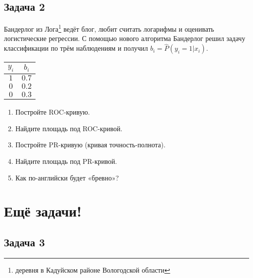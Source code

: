 \documentclass[12pt, a4paper, oneside]{article}
\begin{document}



\subsection*{Задача 2}

	Бандерлог из Лога\footnote{деревня в Кадуйском районе Вологодской области} ведёт блог, любит считать логарифмы и оценивать логистические регрессии. С помощью нового алгоритма Бандерлог решил задачу классификации по трём наблюдениям и получил $b_i = \hat P(y_i = 1|x_i)$.
	
\begin{center}
	\begin{tabular}{c|c}
		$y_i$ & $b_i$ \\
		\hline
		$1$  & $0.7$ \\
		$0$ & $0.2$ \\
		$0$ & $0.3$ \\
	\end{tabular}
\end{center}
	
	\begin{enumerate}
		\item Постройте ROC-кривую.
		\item Найдите площадь под ROC-кривой.
		\item Постройте PR-кривую (кривая точность-полнота).
		\item Найдите площадь под PR-кривой.
		\item Как по-английски будет «бревно»?
	\end{enumerate}



\section*{Ещё задачи!}

\subsection*{Задача 3}
\end{document}
